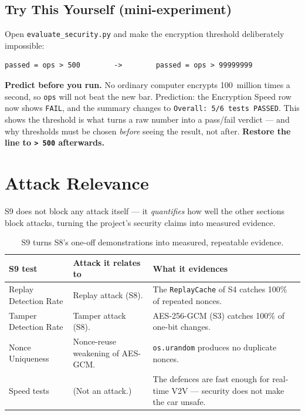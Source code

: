 \documentclass[11pt,a4paper]{article}
\begin{document}
\subsection{Try This Yourself (mini-experiment)}
Open \texttt{evaluate\_security.py} and make the encryption threshold
deliberately impossible:
\begin{lstlisting}[style=term]
passed = ops > 500        ->        passed = ops > 99999999
\end{lstlisting}
\textbf{Predict before you run.} No ordinary computer encrypts 100~million times
a second, so \texttt{ops} will not beat the new bar. Prediction: the Encryption
Speed row now shows \texttt{FAIL}, and the summary changes to \texttt{Overall:
5/6 tests PASSED}. This shows the threshold is what turns a raw number into a
pass/fail verdict --- and why thresholds must be chosen \emph{before} seeing the
result, not after. \textbf{Restore the line to \texttt{> 500} afterwards.}

\section{Attack Relevance}

S9 does not block any attack itself --- it \emph{quantifies} how well the other
sections block attacks, turning the project's security claims into measured
evidence.

\begin{table}[h]
\centering
\small
\begin{tabular}{@{}p{3.6cm} p{4.2cm} p{4.6cm}@{}}
\toprule
\textbf{S9 test} & \textbf{Attack it relates to} & \textbf{What it evidences}\\
\midrule
Replay Detection Rate & Replay attack (S8). & The \texttt{ReplayCache} of S4
catches 100\% of repeated nonces.\\
Tamper Detection Rate & Tamper attack (S8). & AES-256-GCM (S3) catches 100\% of
one-bit changes.\\
Nonce Uniqueness & Nonce-reuse weakening of AES-GCM. & \texttt{os.urandom}
produces no duplicate nonces.\\
Speed tests & (Not an attack.) & The defences are fast enough for real-time V2V
--- security does not make the car unsafe.\\
\bottomrule
\end{tabular}
\caption{S9 turns S8's one-off demonstrations into measured, repeatable evidence.}
\end{table}
\end{document}
